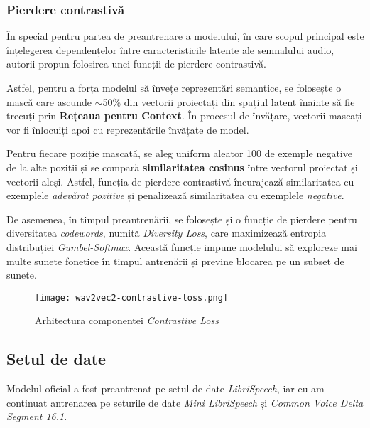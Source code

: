 \subsubsection{Pierdere contrastivă}
În special pentru partea de preantrenare a modelului, în care scopul principal este înțelegerea
dependențelor între caracteristicile latente ale semnalului audio, autorii propun folosirea unei
funcții de pierdere contrastivă. 
\par
Astfel, pentru a forța modelul să învețe reprezentări semantice, se folosește o mască care ascunde
$\sim$50\% din vectorii proiectați din spațiul latent înainte să fie trecuți prin \textbf{Rețeaua pentru Context}.
În procesul de învățare, vectorii mascați vor fi înlocuiți apoi cu reprezentările învățate de model.

\par
Pentru fiecare poziție mascată, se aleg uniform aleator 100 de exemple negative de la alte poziții
și se compară \textbf{similaritatea cosinus} între vectorul proiectat și vectorii aleși.
Astfel, funcția de pierdere contrastivă încurajează similaritatea cu exemplele \textit{adevărat pozitive}
și penalizează similaritatea cu exemplele \textit{negative}.
\par
De asemenea, în timpul preantrenării, se folosește și o funcție de pierdere pentru diversitatea \textit{codewords}, numită
\textit{Diversity Loss}, care maximizează entropia distribuției \textit{Gumbel-Softmax}. Această funcție
impune modelului să exploreze mai multe sunete fonetice în timpul antrenării și previne blocarea pe un
subset de sunete.

\vspace{1em}
\begin{figure}[h]
    \centering 
    \texttt{[image: wav2vec2-contrastive-loss.png]}
    \caption{Arhitectura componentei \textit{Contrastive Loss} \protect\footnotemark[1]}
    \label{fig:wav2vec2-contrastive-loss}
\end{figure}
\vspace{1em}


\subsection{Setul de date}
Modelul oficial a fost preantrenat pe setul de date \textit{LibriSpeech}, iar eu am continuat
antrenarea pe seturile de date \textit{Mini LibriSpeech} și \textit{Common Voice Delta Segment 16.1}.

